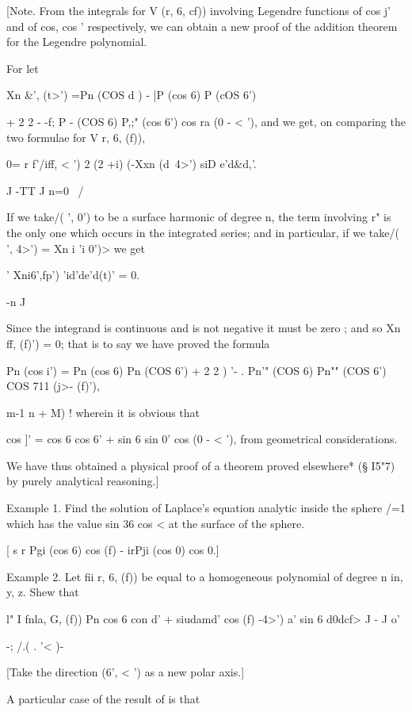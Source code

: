 [Note. From the integrals for V (r, 6, cf)) involving Legendre
functions of cos j' and of cos, cos ' respectively, we can obtain a
new proof of the addition theorem for the Legendre polynomial.

For let

Xn \&', (t>') =Pn (COS d ) - |P (cos 6) P (cOS 6')

+ 2 2 - -f; P - (COS 6) P,;" (cos 6') cos ra (0 - < '), and we get,
on comparing the two formulae for V r, 6, (f)),

0= r f'/iff, < ') 2 (2 +i) (-Xxn (d\ 4>') siD e'd\&d,'.

J -TT J n=0 \ /

If we take/( ', 0') to be a surface harmonic of degree n, the term
involving r" is the only one which occurs in the integrated series;
and in particular, if we take/( ', 4>') = Xn i 'i 0')> we get

' Xni6',fp') 'id'de'd(t)' = 0.

-n J

Since the integrand is continuous and is not negative it must be zero
; and so Xn ff, (f)') = 0; that is to say we have proved the formula

Pn (cos i') = Pn (cos 6) Pn (COS 6') + 2 2 ) '- . Pn'" (COS 6) Pn""
(COS 6') COS 711 (j>- (f)'),

m-1 n + M) ! wherein it is obvious that

cos ]' = cos 6 cos 6' + sin 6 sin 0' cos (0 - < '), from geometrical
considerations.

We have thus obtained a physical proof of a theorem proved elsewhere*
(§ I5"7) by purely analytical reasoning.]

Example 1. Find the solution of Laplace's equation analytic inside the
sphere /=1 which has the value sin 36 cos < at the surface of the
sphere.

[ s r Pgi (cos 6) cos (f) - irPji (cos 0) cos 0.]

Example 2. Let fii r, 6, (f)) be equal to a homogeneous polynomial of
degree n in, y, z. Shew that

l" I fnla, G, (f)) Pn cos 6 con d' + siudamd' cos (f) -4>') a' sin 6
d0dcf> J - J o'

-; /.( . '< )-

[Take the direction (6', < ') as a new polar axis.]

A particular case of the result of  is that

